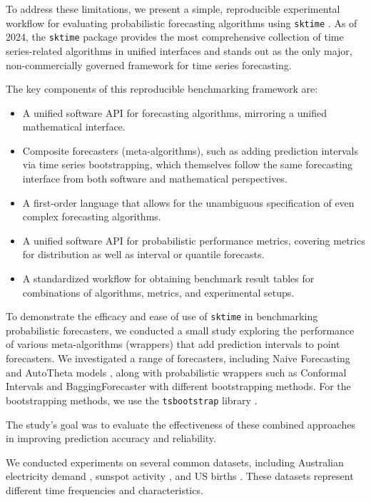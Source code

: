 To address these limitations, we present a simple, reproducible experimental workflow for evaluating probabilistic forecasting algorithms using \texttt{sktime} \citep{franz_kiraly_2024_11095261_sktime}. As of 2024, the \texttt{sktime} package provides the most comprehensive collection of time series-related algorithms in unified interfaces and stands out as the only major, non-commercially governed framework for time series forecasting.

The key components of this reproducible benchmarking framework are:

\begin{itemize}
  \item A unified software API for forecasting algorithms, mirroring a unified mathematical interface.
  \item Composite forecasters (meta-algorithms), such as adding prediction intervals via time series bootstrapping, which themselves follow the same forecasting interface from both software and mathematical perspectives.
  \item A first-order language that allows for the unambiguous specification of even complex forecasting algorithms.
  \item A unified software API for probabilistic performance metrics, covering metrics for distribution as well as interval or quantile forecasts.
  \item A standardized workflow for obtaining benchmark result tables for combinations of algorithms, metrics, and experimental setups.
\end{itemize}

To demonstrate the efficacy and ease of use of \texttt{sktime} in benchmarking probabilistic forecasters, we conducted a small study exploring the performance of various meta-algorithms (wrappers) that add prediction intervals to point forecasters. We investigated a range of forecasters, including Naive Forecasting and AutoTheta models \citep{autotheta}, along with probabilistic wrappers such as Conformal Intervals and BaggingForecaster with different bootstrapping methods. For the bootstrapping methods, we use the \texttt{tsbootstrap} library \citep{gilda_2024_10866090_tsbootstrap, gilda2024tsbootstrap}.

The study's goal was to evaluate the effectiveness of these combined approaches in improving prediction accuracy and reliability.

We conducted experiments on several common datasets, including Australian electricity demand \citep{Godahewa2021Australian}, sunspot activity \citep{Godahewa2021Sunspot}, and US births \citep{Godahewa2021USBirth}. These datasets represent different time frequencies and characteristics.

